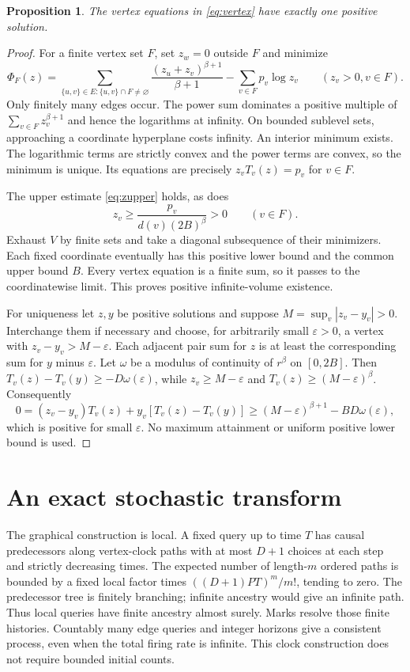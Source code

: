 \documentclass[11pt,a4paper]{article}
\newtheorem{proposition}[theorem]{Proposition}
\newcommand{\Tv}{T_v}
\begin{document}
\begin{proposition}\label{prop:equilibrium}
The vertex equations in \eqref{eq:vertex} have exactly one positive solution.
\end{proposition}
\begin{proof}
For a finite vertex set $F$, set $z_w=0$ outside $F$ and minimize
\[
 \Phi_F(z)=\sum_{\{u,v\}\in E:\{u,v\}\cap F\ne\varnothing}
 \frac{(z_u+z_v)^{\beta+1}}{\beta+1}
 -\sum_{v\in F}p_v\log z_v
 \qquad(z_v>0, v\in F).
\]
Only finitely many edges occur. The power sum dominates a positive multiple of
$\sum_{v\in F}z_v^{\beta+1}$ and hence the logarithms at infinity. On bounded
sublevel sets, approaching a coordinate hyperplane costs infinity. An interior
minimum exists. The logarithmic terms are strictly convex and the power terms
are convex, so the minimum is unique. Its equations are precisely
$z_v\Tv(z)=p_v$ for $v\in F$.

The upper estimate \eqref{eq:zupper} holds, as does
\[
 z_v\geq \frac{p_v}{d(v)(2B)^\beta}>0\qquad(v\in F).
\]
Exhaust $V$ by finite sets and take a diagonal subsequence of their minimizers.
Each fixed coordinate eventually has this positive lower bound and the common
upper bound $B$. Every vertex equation is a finite sum, so it passes to the
coordinatewise limit. This proves positive infinite-volume existence.

For uniqueness let $z,y$ be positive solutions and suppose
$M=\sup_v|z_v-y_v|>0$. Interchange them if necessary and choose, for arbitrarily
small $\varepsilon>0$, a vertex with $z_v-y_v>M-\varepsilon$. Each adjacent
pair sum for $z$ is at least the corresponding sum for $y$ minus $\varepsilon$.
Let $\omega$ be a modulus of continuity of $r^\beta$ on $[0,2B]$. Then
$\Tv(z)-\Tv(y)\geq-D\omega(\varepsilon)$, while
$z_v\geq M-\varepsilon$ and $\Tv(z)\geq(M-\varepsilon)^\beta$. Consequently
\[
 0=(z_v-y_v)\Tv(z)+y_v[\Tv(z)-\Tv(y)]
 \geq(M-\varepsilon)^{\beta+1}-BD\omega(\varepsilon),
\]
which is positive for small $\varepsilon$. No maximum attainment or uniform
positive lower bound is used.
\end{proof}

\section{An exact stochastic transform}

The graphical construction is local. A fixed query up to time $T$ has causal
predecessors along vertex-clock paths with at most $D+1$ choices at each step
and strictly decreasing times. The expected number of length-$m$ ordered paths
is bounded by a fixed local factor times $((D+1)PT)^m/m!$, tending to zero.
The predecessor tree is finitely branching; infinite ancestry would give an
infinite path. Thus local queries have finite ancestry almost surely. Marks
resolve those finite histories. Countably many edge queries and integer
horizons give a consistent process, even when the total firing rate is infinite.
This clock construction does not require bounded initial counts.
\end{document}
